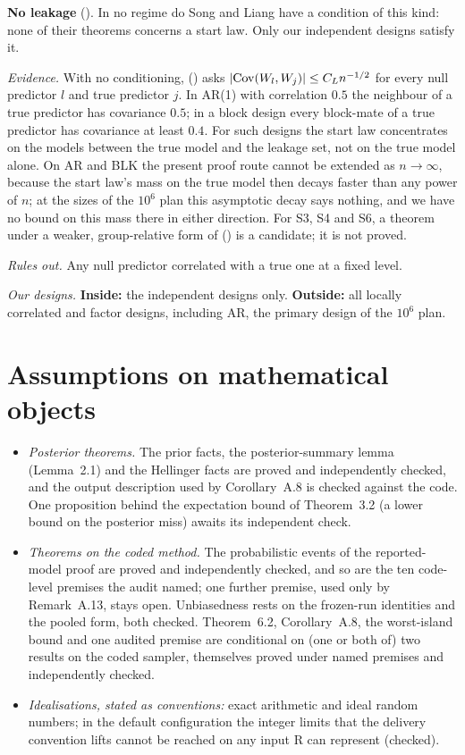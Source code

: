 \documentclass[11pt]{article}
\newcommand{\lab}[1]{\textup{(\asmdisp{#1})}}
\newcommand{\SL}{Song and Liang}
\newcommand{\ahead}[3]{\par\smallskip\noindent\textbf{#1} #2. #3\par}
\newcommand{\ev}[1]{\noindent\emph{Evidence.} #1\par}
\newcommand{\ro}[1]{\noindent\emph{Rules out.} #1\par}
\newcommand{\ds}[1]{\noindent\emph{Our designs.} #1\par}
\begin{document}
\ahead{No leakage}{\lab{NL}}{In no regime do \SL{} have a condition of this kind: none of their theorems concerns a
start law. Only our independent designs satisfy it.}
\ev{With no conditioning, \lab{NL} asks $\lvert \operatorname{Cov}(W_l,W_j)\rvert\le C_Ln^{-1/2}$ for every null predictor $l$ and true
predictor $j$. In AR(1) with correlation $0.5$ the neighbour of a true predictor has covariance $0.5$; in a block design
every block-mate of a true predictor has covariance at least $0.4$. For such designs the start law concentrates on the
models between the true model and the leakage set, not on the true model alone. On AR and BLK the present proof route
cannot be extended as $n\to\infty$, because the start law's mass on the true model then decays faster than any power of
$n$; at the sizes of the $10^6$ plan this asymptotic decay says nothing, and we have no bound on this mass there in either
direction. For S3, S4 and S6, a theorem under a weaker, group-relative form of \lab{NL} is a candidate; it is not
proved.}
\ro{Any null predictor correlated with a true one at a fixed level.}
\ds{\textbf{Inside:} the independent designs only. \textbf{Outside:} all locally correlated and factor designs, including AR, the
primary design of the $10^6$ plan.}

\section{Assumptions on mathematical objects}\label{sec:a-math}

\begin{itemize}[leftmargin=1.5em,itemsep=2pt]
  \item \emph{Posterior theorems.} The prior facts, the posterior-summary lemma (Lemma~2.1) and the Hellinger facts
    are proved and independently checked, and the output description used by Corollary~A.8 is checked against the code.
    One proposition behind the expectation bound of Theorem~3.2 (a lower bound on the posterior miss) awaits its
    independent check.
  \item \emph{Theorems on the coded method.} The probabilistic events of the reported-model proof are proved and
    independently checked, and so are the ten code-level premises the audit named; one further premise, used only by
    Remark~A.13, stays open. Unbiasedness rests on the frozen-run identities and the pooled form, both checked.
    Theorem~6.2, Corollary~A.8, the worst-island bound and one audited premise are conditional on (one or both of) two
    results on the coded sampler, themselves proved under named premises and independently checked.
  \item \emph{Idealisations, stated as conventions:} exact arithmetic and ideal random numbers; in the default configuration the
    integer limits that the delivery convention lifts cannot be reached on any input R can represent (checked).
\end{itemize}

\renewcommand{\bibsection}{\par\medskip\noindent\textbf{Reference}\par}
{\small}
\end{document}
